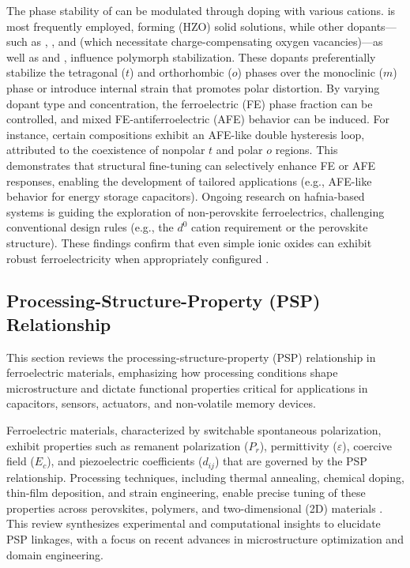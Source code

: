\documentclass[a4paper,fleqn]{cas-sc}
\begin{document}
\par The phase stability of  can be modulated through doping with various cations.  is most frequently employed, forming  (HZO) solid solutions, while other dopants—such as , , and  (which necessitate charge-compensating oxygen vacancies)—as well as  and , influence polymorph stabilization. These dopants preferentially stabilize the tetragonal ($t$) and orthorhombic ($o$) phases over the monoclinic ($m$) phase or introduce internal strain that promotes polar distortion. By varying dopant type and concentration, the ferroelectric (FE) phase fraction can be controlled, and mixed FE-antiferroelectric (AFE) behavior can be induced. For instance, certain compositions exhibit an AFE-like double hysteresis loop, attributed to the coexistence of nonpolar $t$ and polar $o$ regions. This demonstrates that structural fine-tuning can selectively enhance FE or AFE responses, enabling the development of tailored applications (e.g., AFE-like behavior for energy storage capacitors). Ongoing research on hafnia-based systems is guiding the exploration of non-perovskite ferroelectrics, challenging conventional design rules (e.g., the $d^0$ cation requirement or the perovskite structure). These findings confirm that even simple ionic oxides can exhibit robust ferroelectricity when appropriately configured \cite{Zhu2024}.


\subsection{Processing-Structure-Property (PSP) Relationship} \label{PSP}
This section reviews the processing-structure-property (PSP) relationship in ferroelectric materials, emphasizing how processing conditions shape microstructure and dictate functional properties critical for applications in capacitors, sensors, actuators, and non-volatile memory devices.
\par Ferroelectric materials, characterized by switchable spontaneous polarization, exhibit properties such as remanent polarization (\(P_r\)), permittivity (\(\varepsilon\)), coercive field (\(E_c\)), and piezoelectric coefficients (\(d_{ij}\)) that are governed by the PSP relationship. Processing techniques, including thermal annealing, chemical doping, thin-film deposition, and strain engineering, enable precise tuning of these properties across perovskites, polymers, and two-dimensional (2D) materials \cite{kruse2023two}. This review synthesizes experimental and computational insights to elucidate PSP linkages, with a focus on recent advances in microstructure optimization and domain engineering.
\end{document}
